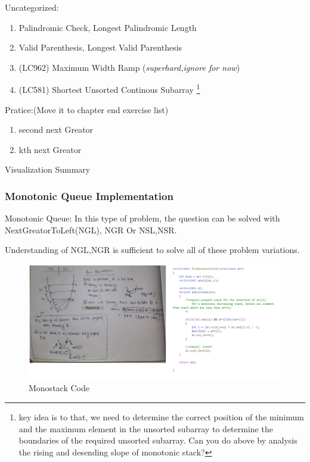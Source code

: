\begin{exercise}
    Uncategorized:
    \begin{enumerate}
        \item Palindromic Check, Longest Palindromic Length
        \item Valid Parenthesis, Longest Valid Parenthesis
        \item (LC962) Maximum Width Ramp (\textit{superhard,ignore for now})
        
        \item (LC581) Shortest Unsorted Continous Subarray \footnote{key idea is to that, we need to determine the correct position of the minimum and the maximum element in the unsorted subarray to determine the boundaries of the required unsorted subarray.
        Can you do above by analysis the rising and desending slope of monotonic stack?
        }
    \end{enumerate}

    Pratice:(Move it to chapter end exercise list)
    \begin{enumerate}
        \item second next Greator
        \item kth next Greator
    \end{enumerate}
\end{exercise}

\hrulefill Visualization Summary \hrulefill

\subsubsection{Monotonic Queue Implementation}

Monotonic Queue:    
In this type of problem, the question can be solved with NextGreatorToLeft(NGL), NGR Or NSL,NSR.

Understanding of NGL,NGR is sufficient to solve all of these problem variations.

\begin{fullwidth}
\begin{figure}[h]
    
    \caption{Monostack Code}
    \includegraphics[width=\dimexpr\textwidth+\marginparwidth\relax]{resources/monotonic-decreasing-stack-2.jpg}
    \end{figure}

\end{fullwidth}

